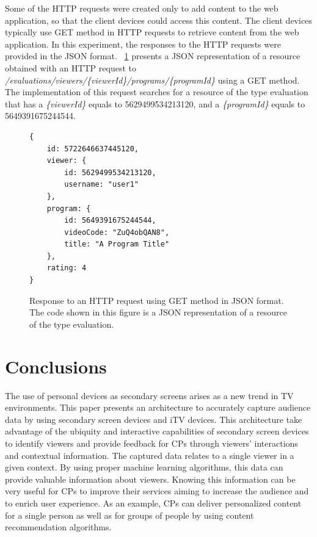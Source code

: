 \documentclass[journal]{IEEEtran}
\begin{document}
Some of the HTTP requests were created only to add content to the web application, so that the client devices could access this content. The client devices typically use GET method in HTTP requests to retrieve content from the web application. In this experiment, the responses to the HTTP requests were provided in the JSON format. \figurename{~\ref{fig_response_json}} presents a JSON representation of a resource obtained with an HTTP request to \emph{/evaluations/viewers/\{viewerId\}/programs/\{programId\}} using a GET method. The implementation of this request searches for a resource of the type evaluation that has a \emph{\{viewerId\}} equals to 5629499534213120, and a \emph{\{programId\}} equals to 5649391675244544.

\begin{figure}
\begin{verbatim}
{
    id: 5722646637445120,
    viewer: {
        id: 5629499534213120,
        username: "user1"
    },
    program: {
        id: 5649391675244544,
        videoCode: "ZuQ4obQAN8",
        title: "A Program Title"
    },
    rating: 4
}
\end{verbatim}
\caption{Response to an HTTP request using GET method in JSON format. The code shown in this figure is a JSON representation of a resource of the type evaluation.}
\label{fig_response_json}
\end{figure}

\section{Conclusions}

The use of personal devices as secondary screens arises as a new trend in TV environments. This paper presents an architecture to accurately capture audience data by using secondary screen devices and iTV devices. This architecture take advantage of the ubiquity and interactive capabilities of secondary screen devices to identify viewers and provide feedback for CPs through viewers' interactions and contextual information. The captured data relates to a single viewer in a given context. By using proper machine learning algorithms, this data can provide valuable information about viewers. Knowing this information can be very useful for CPs to improve their services aiming to increase the audience and to enrich user experience. As an example, CPs can deliver personalized content for a single person as well as for groups of people by using content recommendation algorithms.
\end{document}
